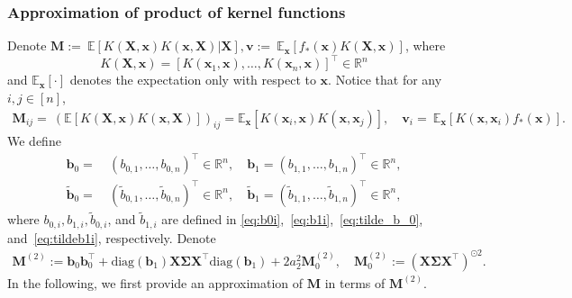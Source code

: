 \documentclass[twoside,11pt]{article}
\newcommand{\R}{\mathbb{R}}
\newcommand{\E}{\mathbb{E}}
\newcommand{\diag}{\text{diag}}
\def\bX{{\boldsymbol X}}
\def\bM{{\boldsymbol M}}
\def\bb{{\boldsymbol b}}
\def\bv{{\boldsymbol v}}
\def\bx{{\boldsymbol x}}
\def\bSigma{{\boldsymbol \Sigma}}
\newcommand{\Tr}{\operatorname{Tr}}
\newcommand{\1}{\mathbf{1}}
\begin{document}
\subsubsection{Approximation of product of kernel functions}\label{sec:quadratic_appro}
Denote  $\bM :=~ \E[K(\bX,\bx) K(\bx,\bX)|\bX], 
    \bv := ~ \E_\bx[f_*(\bx)K(\bX,\bx)]$,
where \[K(\bX,\bx)=[K(\bx_1,\bx),\dots, K(\bx_n,\bx)]^\top\in \R^{n}\] and $\E_\bx[\cdot]$ denotes the expectation only with respect to $\bx$.  Notice that for any $i,j\in[n]$,
    \begin{align*}
        \bM_{ij}=~(\E[K(\bX,\bx) K(\bx,\bX)])_{ij}=\E_\bx[K(\bx_i,\bx)K(\bx,\bx_j)],\quad 
        \bv_{i}=~\E_\bx[K(\bx,\bx_i)f_*(\bx)].
    \end{align*}
We define
\begin{align}
    \bb_{0}=~&(b_{0,1},\dots,b_{0,n})^\top \in \R^n,\quad
    \bb_{1}=( b_{1,1},\dots, b_{1,n})^\top \in \R^n, \label{eq:b_0}\\
    \widetilde\bb_{0}=~&(\widetilde b_{0,1},\dots,\widetilde b_{0,n})^\top \in \R^n,\quad
    \widetilde\bb_{1}=( \widetilde b_{1,1},\dots, \widetilde b_{1,n})^\top \in \R^n,\label{eq:tilde_b_0}
\end{align}
where $b_{0,i},b_{1,i}, \widetilde{b}_{0,i}$, and $\widetilde{b}_{1,i}$ are defined in \eqref{eq:b0i},~\eqref{eq:b1i},~\eqref{eq:tilde_b_0}, and~\eqref{eq:tildeb1i}, respectively. Denote
\begin{align}
    \bM^{(2)}:= \bb_0 \bb_0^\top+ \diag(\bb_1)\bX\bSigma\bX^\top\diag(\bb_1) +2a^2_2\bM^{(2)}_0,\quad 
    \bM^{(2)}_0:= (\bX\bSigma\bX^\top)^{\odot 2}.\label{eq:M(2)}
\end{align}
In the following, we first provide an approximation of $\bM$ in terms of $\bM^{(2)}$.
\end{document}
